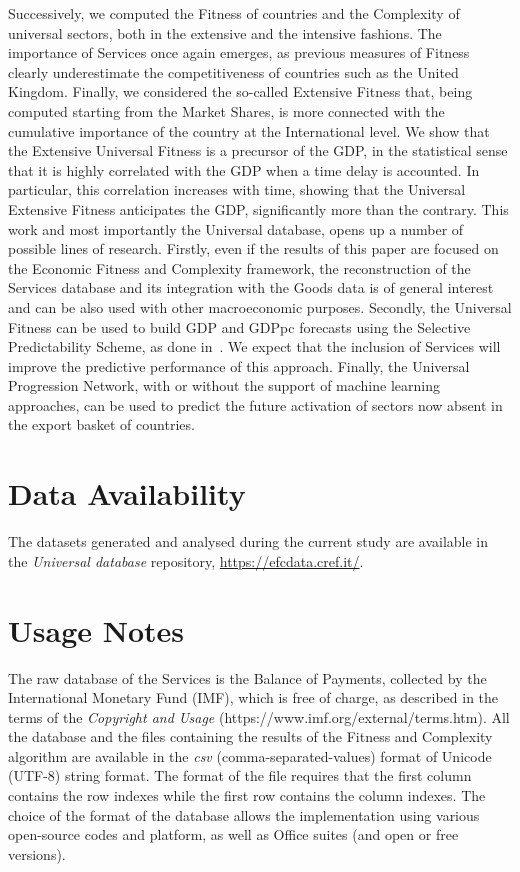 \documentclass[fleqn,10pt]{article}
\begin{document}
Successively, we computed the Fitness of countries and the Complexity of universal sectors, both in the extensive and the intensive fashions. 
The importance of Services once again emerges, as previous measures of Fitness clearly underestimate the competitiveness of countries such as the United Kingdom. 
Finally, we considered the so-called Extensive Fitness that, being computed starting from the Market Shares, is more connected with the cumulative importance of the country at the International level. 
We show that the Extensive Universal Fitness is a precursor of the GDP, in the statistical sense that it is highly correlated with the GDP when a time delay is accounted. 
In particular, this correlation increases with time, showing that the Universal Extensive Fitness anticipates the GDP, significantly more than the contrary.
This work and most importantly the Universal database, opens up a number of possible lines of research. 
Firstly, even if the results of this paper are focused on the Economic Fitness and Complexity framework, the reconstruction of the Services database and its integration with the Goods data is of general interest and can be also used with other macroeconomic purposes. Secondly, the Universal Fitness can be used to build GDP and GDPpc forecasts using the Selective Predictability Scheme, as done in~\cite{Cristelli2017,Tacchella2018}. 
We expect that the inclusion of Services will improve the predictive performance of this approach. 
Finally, the Universal Progression Network, with or without the support of machine learning approaches, can be used to predict the future activation of sectors now absent in the export basket of countries.



\section*{Data Availability}
The datasets generated and analysed during the current study are available in the \emph{Universal database} repository, \url{ https://efcdata.cref.it/}.

\section*{Usage Notes}
The raw database of the Services is the Balance of Payments, collected by the International Monetary Fund (IMF), which is free of charge, as described in the terms of the \emph{Copyright and Usage} (https://www.imf.org/external/terms.htm).
All the database and the files containing the results of the Fitness and Complexity algorithm are available in the \emph{csv} (comma-separated-values) format of Unicode (UTF-8) string format.
The format of the file requires that the first column contains the row indexes while the first row contains the column indexes.
The choice of the format of the database allows the implementation using various open-source codes and platform, as well as Office suites (and open or free versions).
\end{document}
